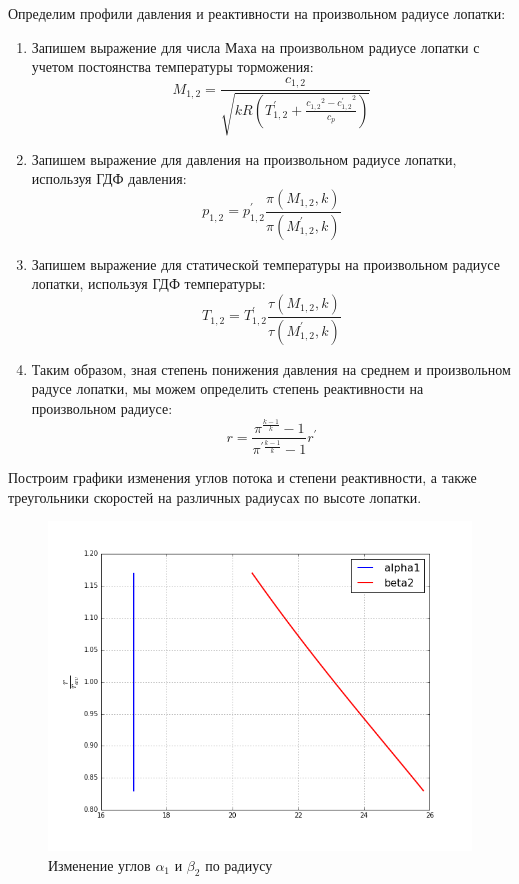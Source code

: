 \documentclass[a4paper,10pt]{article}
\begin{document}
Определим профили давления и реактивности на произвольном радиусе лопатки:
\begin{enumerate}
\item Запишем выражение для числа Маха на произвольном радиусе лопатки с учетом постоянства температуры торможения:
$$M_{1, 2} = \frac{
	c_{1,2}
}{
	\sqrt{kR \left( T_{1, 2}^\prime + \frac{{c_{1,2}}^2 - {c_{1,2}^\prime}^2}{c_p} \right)}
}$$
\item Запишем выражение для давления на произвольном радиусе лопатки, используя ГДФ давления:
$$p_{1,2} = p_{1,2}^\prime \frac{
	\pi(M_{1,2}, k)
}{
	\pi(M_{1,2}^\prime, k)
}$$
\item Запишем выражение для статической температуры на произвольном радиусе лопатки, используя ГДФ температуры:
$$T_{1,2} = T_{1,2}^\prime \frac{
	\tau(M_{1,2}, k)
}{
	\tau(M_{1,2}^\prime, k)
}$$
\item Таким образом, зная степень понижения давления на среднем и произвольном радусе лопатки, мы можем определить степень реактивности на произвольном радиусе:
$$r = \frac{\pi^{\frac{k-1}{k}} - 1}{\pi^{\prime \frac{k-1}{k}} - 1} r^\prime$$

\end{enumerate}

Построим графики изменения углов потока и степени реактивности, а также треугольники скоростей на различных радиусах по высоте лопатки.

\begin{figure}[hbtp]
\centering
\includegraphics[scale=0.3]{../../plots/alpha1_beta2_st1.png}
\caption{Изменение углов $\alpha_1$ и $\beta_2$ по радиусу}
\end{figure}
\end{document}
